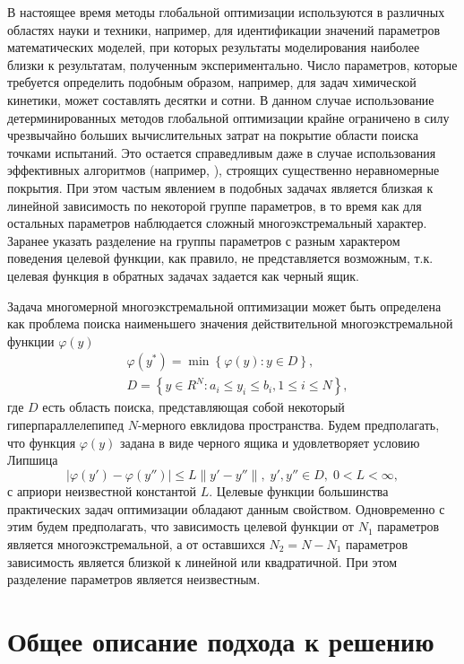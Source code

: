 \documentclass[11pt, oneside, a4paper]{article}
\begin{document}
В настоящее время методы глобальной оптимизации используются в различных областях науки и техники, например, для идентификации значений параметров математических моделей, при которых результаты моделирования наиболее близки к результатам, полученным экспериментально.
Число параметров, которые требуется определить подобным образом, например, для задач химической кинетики, может составлять десятки и сотни. В данном случае использование детерминированных методов глобальной оптимизации крайне ограничено в силу чрезвычайно больших вычислительных затрат на покрытие области поиска точками испытаний. Это остается справедливым даже в случае использования эффективных алгоритмов (например, \cite{Evtushenko2009,Paulavicius2016}), строящих существенно неравномерные покрытия. 
При этом частым явлением в подобных задачах является близкая к линейной зависимость по некоторой группе параметров, в то время как для остальных параметров наблюдается сложный многоэкстремальный характер. Заранее указать разделение на группы параметров с разным характером поведения целевой функции, как правило, не представляется возможным, т.к. целевая функция в обратных задачах задается как черный ящик. 

Задача многомерной многоэкстремальной оптимизации может быть определена как проблема поиска наименьшего значения действительной многоэкстремальной функции $\varphi(y)$
\begin{eqnarray}\label{main_problem}
& \varphi(y^\ast)=\min{\left\{\varphi(y): y\in D\right\}},  \\
& D=\left\{y\in R^N: a_i\leq y_i \leq b_i, 1\leq i \leq N\right\}, \nonumber
\end{eqnarray}
где $D$ есть область поиска, представляющая собой некоторый гиперпараллелепипед $N$-мерного евклидова пространства.
Будем предполагать, что функция $\varphi(y)$ задана в виде черного ящика и удовлетворяет условию Липшица
\[
\left|\varphi(y')-\varphi(y'')\right|\leq L\left\|y'-y''\right\|,\; y',y'' \in D,\; 0<L<\infty,
\]
с априори неизвестной константой $L$.
Целевые функции большинства практических задач оптимизации обладают данным свойством.
Одновременно с этим будем предполагать, что зависимость целевой функции от $N_1$ параметров является многоэкстремальной, а от оставшихся $N_2 = N - N_1$ параметров зависимость является близкой к линейной или квадратичной. При этом разделение  параметров является неизвестным.

\section{Общее описание подхода к решению}
\end{document}
